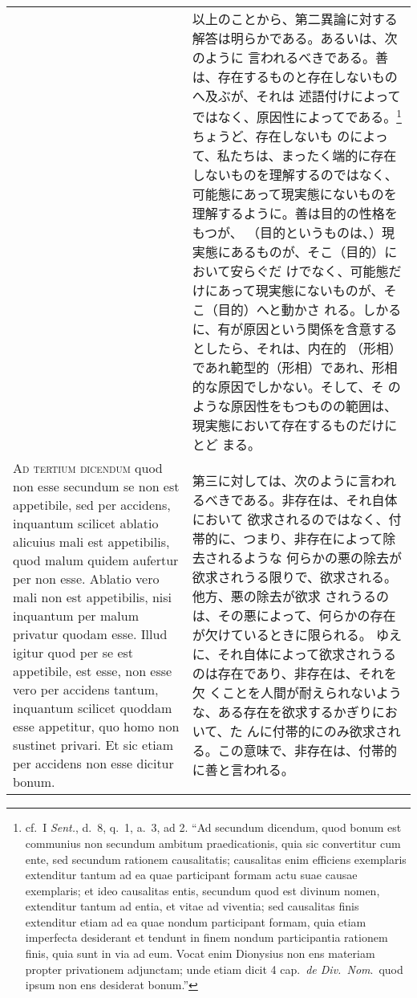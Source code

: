 \documentclass[10pt]{jsarticle}
\begin{document}
\begin{longtable}{p{21em}p{21em}}
&

以上のことから、第二異論に対する解答は明らかである。あるいは、次のように
 言われるべきである。善は、存在するものと存在しないものへ及ぶが、それは
 述語付けによってではなく、原因性によってである。\footnote{cf.~I
 {\itshape Sent.}, d.~8, q.~1, a.~3, ad 2. ``Ad secundum dicendum, quod
 bonum est communius non secundum ambitum praedicationis, quia sic
 convertitur cum ente, sed secundum rationem causalitatis; causalitas
 enim efficiens exemplaris extenditur tantum ad ea quae participant
 formam actu suae causae exemplaris; et ideo causalitas entis, secundum
 quod est divinum nomen, extenditur tantum ad entia, et vitae ad
 viventia; sed causalitas finis extenditur etiam ad ea quae nondum
 participant formam, quia etiam imperfecta desiderant et tendunt in
 finem nondum participantia rationem finis, quia sunt in via ad
 eum. Vocat enim Dionysius non ens materiam propter privationem
 adjunctam; unde etiam dicit 4 cap.~{\itshape de Div.~Nom}.~quod ipsum non ens
 desiderat bonum.''}ちょうど、存在しないも
 のによって、私たちは、まったく端的に存在しないものを理解するのではなく、
 可能態にあって現実態にないものを理解するように。善は目的の性格をもつが、
 （目的というものは、）現実態にあるものが、そこ（目的）において安らぐだ
 けでなく、可能態だけにあって現実態にないものが、そこ（目的）へと動かさ
 れる。しかるに、有が原因という関係を含意するとしたら、それは、内在的
 （形相）であれ範型的（形相）であれ、形相的な原因でしかない。そして、そ
 のような原因性をもつものの範囲は、現実態において存在するものだけにとど
 まる。

\\



{\scshape Ad tertium dicendum} quod non esse secundum se non est
 appetibile, sed per accidens, inquantum scilicet ablatio alicuius mali
 est appetibilis, quod malum quidem aufertur per non esse. Ablatio vero
 mali non est appetibilis, nisi inquantum per malum privatur quodam
 esse. Illud igitur quod per se est appetibile, est esse, non esse vero
 per accidens tantum, inquantum scilicet quoddam esse appetitur, quo
 homo non sustinet privari. Et sic etiam per accidens non esse dicitur
 bonum.

&

第三に対しては、次のように言われるべきである。非存在は、それ自体において
 欲求されるのではなく、付帯的に、つまり、非存在によって除去されるような
 何らかの悪の除去が欲求されうる限りで、欲求される。他方、悪の除去が欲求
 されうるのは、その悪によって、何らかの存在が欠けているときに限られる。
 ゆえに、それ自体によって欲求されうるのは存在であり、非存在は、それを欠
 くことを人間が耐えられないような、ある存在を欲求するかぎりにおいて、た
 んに付帯的にのみ欲求される。この意味で、非存在は、付帯的に善と言われる。


\end{longtable}
\end{document}
